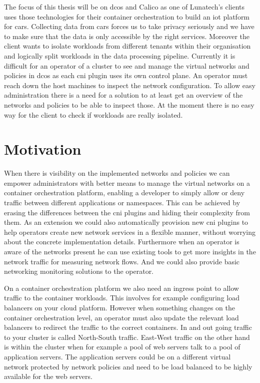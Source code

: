 The focus of this thesis will be on \gls{dcos} and Calico as one of Lunatech's clients uses those technologies for their container orchestration to build an \gls{iot} platform for cars. Collecting data from cars forces us to take privacy seriously and we have to make sure that the data is only accessible by the right services. Moreover the client wants to isolate workloads from different tenants within their organisation and logically split workloads in the data processing pipeline. Currently it is difficult for an operator of a cluster to see and manage the virtual networks and policies in \gls{dcos} as each \gls{cni} plugin uses its own control plane. An operator must reach down the host machines to inspect the network configuration. To allow easy administration there is a need for a solution to at least get an overview of the networks and policies to be able to inspect those. At the moment there is no easy way for the client to check if workloads are really isolated. 

\section{Motivation}
\label{motiviation}
When there is visibility on the implemented networks and policies we can empower administrators with better means to manage the virtual networks on a container orchestration platform, enabling a developer to simply allow or deny traffic between different applications or namespaces. This can be achieved by erasing the differences between the \gls{cni} plugins and hiding their complexity from them. As an extension we could also automatically provision new \gls{cni} plugins to help operators create new network services in a flexible manner, without worrying about the concrete implementation details. Furthermore when an operator is aware of the networks present he can use existing tools to get more insights in the network traffic for measuring network flows. And we could also provide basic networking monitoring solutions to the operator.

On a container orchestration platform we also need an ingress point to allow traffic to the container workloads. This involves for example configuring load balancers on your cloud platform. However when something changes on the container orchestration level, an operator must also update the relevant load balancers to redirect the traffic to the correct containers. In and out going traffic to your cluster is called North-South traffic. East-West traffic on the other hand is within the cluster when for example a pool of web servers talk to a pool of application servers. The application servers could be on a different virtual network protected by network policies and need to be load balanced to be highly available for the web servers.

